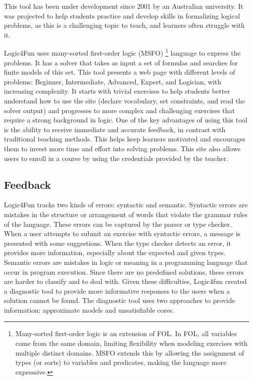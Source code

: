 This tool has been under development since 2001 by an Australian university. It was projected to help students practice and develop skills in formalizing logical problems, as this is a challenging topic to teach, and learners often struggle with it.

Logic4Fun uses many-sorted first-order logic (MSFO) \footnote{Many-sorted first-order logic is an extension of \gls{FOL}. In \gls{FOL}, all variables come from the same domain, limiting flexibility when modeling exercises with multiple distinct domains. MSFO extends this by allowing the assignment of types (or sorts) to variables and predicates, making the language more expressive.} language to express the problems. It has a solver that takes as input a set of formulas and searches for finite models of this set. This tool presents a web page with different levels of problems: Beginner, Intermediate, Advanced, Expert, and Logician, with increasing complexity. It starts with trivial exercises to help students better understand how to use the site (declare vocabulary, set constraints, and read the solver output) and progresses to more complex and challenging exercises that require a strong background in logic. One of the key advantages of using this tool is the ability to receive immediate and accurate feedback, in contrast with traditional teaching methods. This helps keep learners motivated and encourages them to invest more time and effort into solving problems. This site also allows users to enroll in a course by using the credentials provided by the teacher.

\subsection{Feedback}

Logic4Fun tracks two kinds of errors: syntactic and semantic. Syntactic errors are mistakes in the structure or arrangement of words that violate the grammar rules of the language. These errors can be captured by the parser or type checker. When a user attempts to submit an exercise with syntactic errors, a message is presented with some suggestions. When the type checker detects an error, it provides more information, especially about the expected and given types. Semantic errors are mistakes in logic or meaning in a programming language that occur in program execution. Since there are no predefined solutions, these errors are harder to classify and to deal with. Given these difficulties, Logic4fun created a diagnostic tool to provide more informative responses to the users when a solution cannot be found. The diagnostic tool uses two approaches to provide information: approximate models and unsatisfiable cores.

